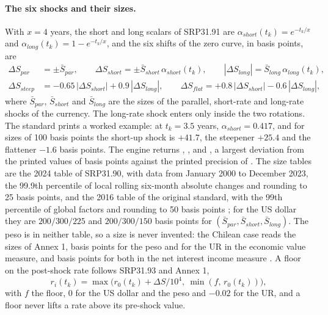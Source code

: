 \paragraph{The six shocks and their sizes.}
With $x=4$ years, the short and long scalars of SRP31.91 are $\alpha_{short}(t_k)=e^{-t_k/x}$ and $\alpha_{long}(t_k)=1-e^{-t_k/x}$, and the six shifts of the zero curve, in basis points, are
\begin{align}
\Delta S_{par}&=\pm\bar S_{par},\qquad \Delta S_{short}=\pm\bar S_{short}\,\alpha_{short}(t_k),\qquad |\Delta S_{long}|=\bar S_{long}\,\alpha_{long}(t_k),\label{eq:alm-shapes}\\
\Delta S_{steep}&=-0.65\,|\Delta S_{short}|+0.9\,|\Delta S_{long}|,\qquad \Delta S_{flat}=+0.8\,|\Delta S_{short}|-0.6\,|\Delta S_{long}|,\label{eq:alm-rotations}
\end{align}
where $\bar S_{par}$, $\bar S_{short}$ and $\bar S_{long}$ are the sizes of the parallel, short-rate and long-rate shocks of the currency. The long-rate shock enters only inside the two rotations. The standard prints a worked example: at $t_k=3.5$ years, $\alpha_{short}=0.417$, and for sizes of 100 basis points the short-up shock is $+41.7$, the steepener $+25.4$ and the flattener $-1.6$ basis points. The engine returns \almSrpAlpha{}, \almSrpShortUp{}, \almSrpSteepener{} and \almSrpFlattener{}, a largest deviation from the printed values of \almSrpDevMax{} basis points against the printed precision of \almSrpTolBp{}. The size tables are the 2024 table of SRP31.90, with data from January 2000 to December 2023, the 99.9th percentile of local rolling six-month absolute changes and rounding to 25 basis points, and the 2016 table of the original standard, with the 99th percentile of global factors and rounding to 50 basis points \citep{alm:bcbs2024,alm:bcbs2016}; for the US dollar they are $200/300/225$ and $200/300/150$ basis points for $(\bar S_{par},\bar S_{short},\bar S_{long})$. The peso is in neither table, so a size is never invented: the Chilean case reads the sizes of Annex 1, \almDSizesClp{} basis points for the peso and \almDSizesUr{} for the UR in the economic value measure, and \almDNiiShock{} basis points for both in the net interest income measure \citep{alm:cmf2025}. A floor on the post-shock rate follows SRP31.93 and Annex 1,
\begin{equation}
r_i(t_k)=\max\big(r_0(t_k)+\Delta S/10^{4},\ \min(f,\,r_0(t_k))\big),
\label{eq:alm-floor}
\end{equation}
with $f$ the floor, $0$ for the US dollar and the peso and $-0.02$ for the UR, and a floor never lifts a rate above its pre-shock value.

